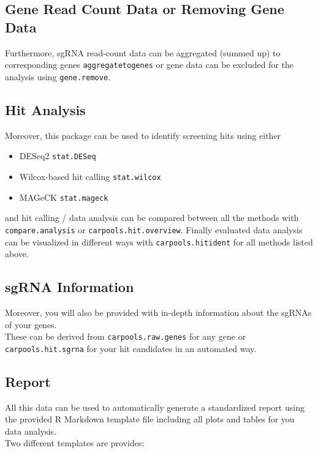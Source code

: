 \documentclass[]{article}
\providecommand{\tightlist}{%
  \setlength{\itemsep}{0pt}\setlength{\parskip}{0pt}}
\begin{document}
\subsection{Gene Read Count Data or Removing Gene
Data}\label{gene-read-count-data-or-removing-gene-data}

Furthermore, sgRNA read-count data can be aggregated (summed up) to
corresponding genes \texttt{aggregatetogenes} or gene data can be
excluded for the analysis using \texttt{gene.remove}.

\subsection{Hit Analysis}\label{hit-analysis}

Moreover, this package can be used to identify screening hits using
either

\begin{itemize}
\tightlist
\item
  DESeq2 \texttt{stat.DESeq}
\item
  Wilcox-based hit calling \texttt{stat.wilcox}
\item
  MAGeCK \texttt{stat.mageck}
\end{itemize}

and hit calling / data analysis can be compared between all the methods
with \texttt{compare.analysis} or \texttt{carpools.hit.overview}.
Finally evaluated data analysis can be visualized in different ways with
\texttt{carpools.hitident} for all methods listed above.

\subsection{sgRNA Information}\label{sgrna-information}

Moreover, you will also be provided with in-depth information about the
sgRNAs of your genes.\\
These can be derived from \texttt{carpools.raw.genes} for any gene or
\texttt{carpools.hit.sgrna} for your hit candidates in an automated way.

\subsection{Report}\label{report}

All this data can be used to automatically generate a standardized
report using the provided R Markdown template file including all plots
and tables for you data analysis.\\
Two different templates are provides:
\end{document}
